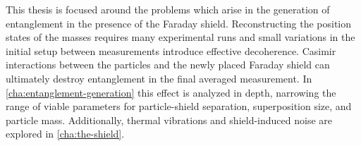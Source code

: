 This thesis is focused around the problems which arise in the generation of entanglement in the presence of the Faraday shield.
Reconstructing the position states of the masses requires many experimental runs and small variations in the initial setup between measurements introduce effective decoherence.
Casimir interactions between the particles and the newly placed Faraday shield can ultimately destroy entanglement in the final averaged measurement.
In \cref{cha:entanglement-generation} this effect is analyzed in depth, narrowing the range of viable parameters for particle-shield separation, superposition size, and particle mass.
Additionally, thermal vibrations and shield-induced noise are explored in \cref{cha:the-shield}.
